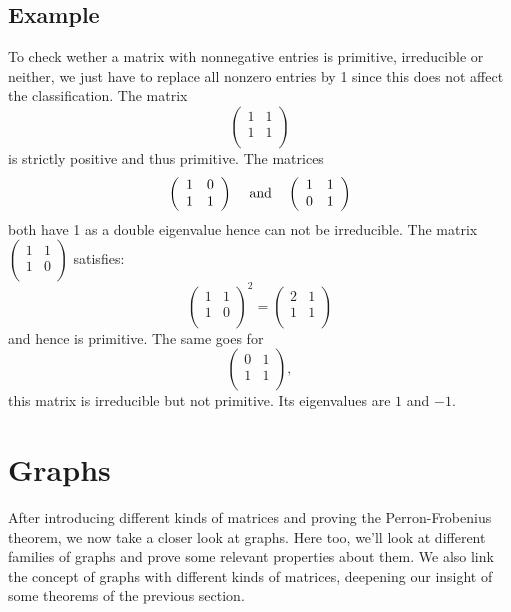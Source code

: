 \documentclass[a4paper,11pt]{report}
\begin{document}
   
   





\subsection{Example}
To check wether a matrix with nonnegative entries is primitive, irreducible or 
neither, we just have to replace all nonzero entries by 1 since this does not 
affect the classification. The matrix
$$\left(\begin{array}{cc}
1 & 1\\
1 & 1 \\
\end{array}\right)$$
is strictly positive and thus primitive. The matrices
$$\left(\begin{array}{cc}
1 & 0\\
1 & 1 \\
\end{array}\right) \text{\;\;\; and \;\;\,} 
\left(\begin{array}{cc}
1 & 1\\
0 & 1 \\
\end{array}\right)$$
both have 1 as a double eigenvalue hence can not be irreducible.
The matrix $\left(\begin{array}{cc}
1 & 1\\
1 & 0 \\
\end{array}\right)$ satisfies:
$$\left(\begin{array}{cc}
1 & 1\\
1 & 0 \\
\end{array}\right)^2 = \left(\begin{array}{cc}
2 & 1\\
1 & 1 \\
\end{array}\right)$$
and hence is primitive. The same goes for $$\left(\begin{array}{cc}
0 & 1\\
1 & 1 \\
\end{array}\right),$$ this matrix is irreducible but not primitive. Its 
eigenvalues are $1$ and $-1$.
\section{Graphs}
After introducing different kinds of matrices and proving the Perron-Frobenius 
theorem, we now take a closer look at graphs. Here too, we'll look at different 
families of graphs and prove some relevant properties about them. We also link 
the concept of graphs with different kinds of matrices, deepening our 
insight of some theorems of the previous section.\\
\end{document}
